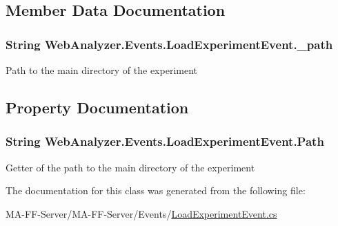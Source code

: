 \subsection{Member Data Documentation}
\hypertarget{class_web_analyzer_1_1_events_1_1_load_experiment_event_ae8805e9e6076aad4f485c959c9f7eb54}{}
\subsubsection[{\+\_\+path}]{\setlength{\rightskip}{0pt plus 5cm}String Web\+Analyzer.\+Events.\+Load\+Experiment\+Event.\+\_\+path\hspace{0.3cm}{\ttfamily [private]}}\label{class_web_analyzer_1_1_events_1_1_load_experiment_event_ae8805e9e6076aad4f485c959c9f7eb54}


Path to the main directory of the experiment 



\subsection{Property Documentation}
\hypertarget{class_web_analyzer_1_1_events_1_1_load_experiment_event_ac86cf22d02cb0c13c9ea9437422b5142}{}
\subsubsection[{Path}]{\setlength{\rightskip}{0pt plus 5cm}String Web\+Analyzer.\+Events.\+Load\+Experiment\+Event.\+Path\hspace{0.3cm}{\ttfamily [get]}}\label{class_web_analyzer_1_1_events_1_1_load_experiment_event_ac86cf22d02cb0c13c9ea9437422b5142}


Getter of the path to the main directory of the experiment 



The documentation for this class was generated from the following file\+:\begin{DoxyCompactItemize}
\item 
M\+A-\/\+F\+F-\/\+Server/\+M\+A-\/\+F\+F-\/\+Server/\+Events/\hyperlink{_load_experiment_event_8cs}{Load\+Experiment\+Event.\+cs}\end{DoxyCompactItemize}
